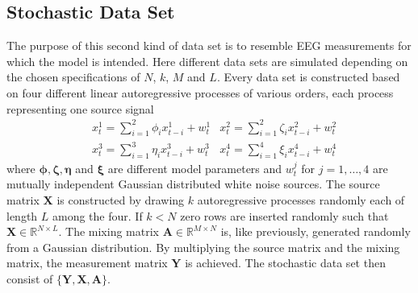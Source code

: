 \subsection{Stochastic Data Set}\label{sec:stoch_data}
The purpose of this second kind of data set is to resemble EEG measurements for which the model is intended. 
Here different data sets are simulated depending on the chosen specifications of $N$, $k$, $M$ and $L$. 
Every data set is constructed based on four different linear autoregressive processes of various orders, each process representing one source signal 
\begin{align*}
&x_{t}^{1} = \sum_{i=1}^{2} \phi_i x_{t-i}^{1} + w_t^{1} &x_{t}^{2} = \sum_{i=1}^{2} \zeta_i x_{t-i}^{2} + w_t^{2} \\
&x_{t}^{3} = \sum_{i=1}^{3} \eta_i x_{t-i}^{3} + w_t^{3}  &x_{t}^{4} = \sum_{i=1}^{4} \xi_i x_{t-i}^{4} + w_t^{4}
\end{align*}
where $\boldsymbol{\phi}, \boldsymbol{\zeta}, \boldsymbol{\eta}$ and $\boldsymbol{\xi}$ are different model parameters and $w_t^{j}$ for $j = 1,\dots ,4$ are mutually independent Gaussian distributed white noise sources.
The source matrix $\mathbf{X}$ is constructed by drawing $k$ autoregressive processes randomly each of length $L$ among the four. 
If $k < N$ zero rows are inserted randomly such that $\mathbf{X} \in \mathbb{R}^{N \times L}$. 
The mixing matrix $\mathbf{A} \in \mathbb{R}^{M \times N}$ is, like previously, generated randomly from a Gaussian distribution.
By multiplying the source matrix and the mixing matrix, the measurement matrix $\mathbf{Y}$ is achieved.
The stochastic data set then consist of $\{ \mathbf{Y}, \mathbf{X}, \mathbf{A} \}$. 


